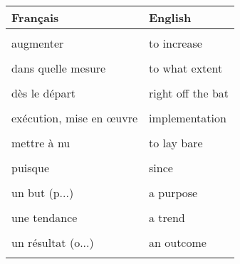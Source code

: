\documentclass[
  10pt,
]{article}
\begin{document}
\begin{longtable}{ll}
\toprule
Français & English\\
\midrule
\cellcolor{gray!6}{aborder un problème} & \cellcolor{gray!6}{to address an issue}\\

augmenter & to increase\\

\cellcolor{gray!6}{bien que} & \cellcolor{gray!6}{although}\\

dans quelle mesure & to what extent\\

\cellcolor{gray!6}{de plus} & \cellcolor{gray!6}{furthermore}\\

dès le départ & right off the bat\\

\cellcolor{gray!6}{en dépit de} & \cellcolor{gray!6}{despite}\\

exécution, mise en œuvre & implementation\\

\cellcolor{gray!6}{les résultats} & \cellcolor{gray!6}{the findings}\\

mettre à nu & to lay bare\\

\cellcolor{gray!6}{pertinent} & \cellcolor{gray!6}{relevant}\\

puisque & since\\

\cellcolor{gray!6}{se concentrer sur} & \cellcolor{gray!6}{to focus on}\\

un but (p...) & a purpose\\

\cellcolor{gray!6}{un échantillon} & \cellcolor{gray!6}{a sample}\\

une tendance & a trend\\

\cellcolor{gray!6}{un moyen de} & \cellcolor{gray!6}{a means to}\\

un résultat (o...) & an outcome\\

\cellcolor{gray!6}{un résumé} & \cellcolor{gray!6}{a summary}\\


\end{longtable}
\end{document}
